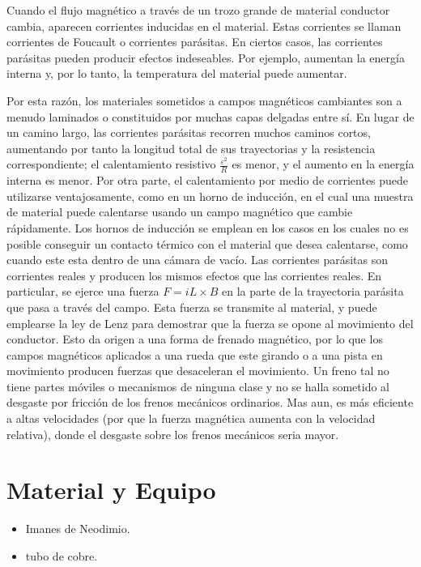 \documentclass[11pt]{article}
\begin{document}
\begin{multicols}{2}
		Cuando el flujo magnético a través de un trozo grande de material conductor cambia, aparecen corrientes inducidas en el material. Estas corrientes se llaman corrientes de Foucault o corrientes parásitas. En ciertos casos, las corrientes parásitas pueden producir efectos indeseables. Por ejemplo, aumentan la energía interna y, por lo tanto, la temperatura del material puede aumentar. 


		Por esta razón, los materiales sometidos a campos magnéticos cambiantes son a menudo laminados o constituidos por muchas capas delgadas entre sí. 
		En lugar de un camino largo, las corrientes parásitas recorren muchos caminos cortos, aumentando por tanto la longitud total de sus trayectorias y la resistencia correspondiente; el calentamiento resistivo $\frac{\varepsilon ^2}{R}$ es menor, y el aumento en la energía interna es menor. Por otra parte, el calentamiento por medio de corrientes puede utilizarse ventajosamente, como en un horno de inducción, en el cual una muestra de material puede calentarse usando un campo magnético que cambie rápidamente. Los hornos de inducción se emplean en los casos en los cuales no es posible conseguir un contacto térmico con el material que desea calentarse, como cuando este esta dentro de una cámara de vacío.
		Las corrientes parásitas son corrientes reales y producen los mismos efectos que las corrientes reales. En particular, se ejerce una fuerza $F=iL\times B$ en la parte de la trayectoria parásita que pasa a través del campo. Esta fuerza se transmite al material, y puede emplearse la ley de Lenz para demostrar que la fuerza se opone al movimiento del conductor. Esto da origen a una forma de frenado magnético, por lo que los campos magnéticos aplicados a una rueda que este girando o a una pista en movimiento producen fuerzas que desaceleran el movimiento. Un freno tal no tiene partes móviles o mecanismos de ninguna clase y no se halla sometido al desgaste por fricción de los frenos mecánicos ordinarios. Mas aun, es más eficiente a altas velocidades (por que la fuerza magnética aumenta con la velocidad relativa), donde el desgaste sobre los frenos mecánicos seria mayor.   


\section{Material y Equipo}

	\begin{itemize}
		\item Imanes de Neodimio.
		\item tubo de cobre.


\end{itemize}
\end{multicols}
\end{document}

